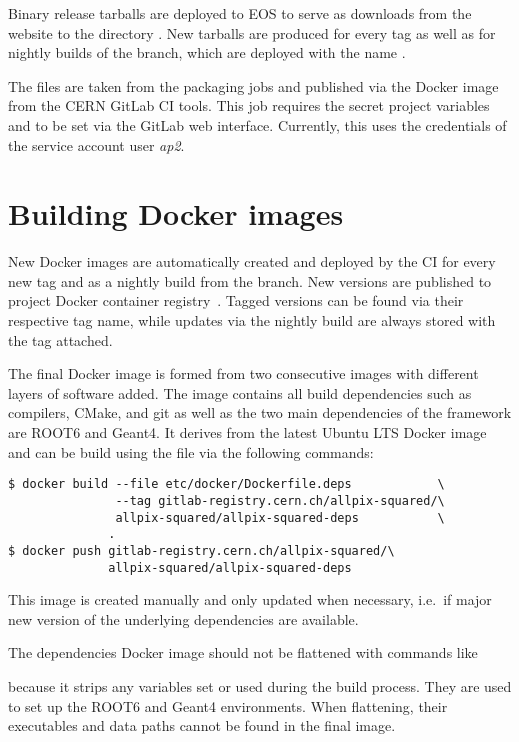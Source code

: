 Binary release tarballs are deployed to EOS to serve as downloads from the website to the directory .
New tarballs are produced for every tag as well as for nightly builds of the  branch, which are deployed with the name .

The files are taken from the packaging jobs and published via the  Docker image from the CERN GitLab CI tools.
This job requires the secret project variables  and  to be set via the GitLab web interface.
Currently, this uses the credentials of the service account user \emph{ap2}.

\section{Building Docker images}
\label{sec:build-docker}

New \apsq Docker images are automatically created and deployed by the CI for every new tag and as a nightly build from the  branch.
New versions are published to project Docker container registry~\cite{ap2-container-registry}.
Tagged versions can be found via their respective tag name, while updates via the nightly build are always stored with the  tag attached.

The final Docker image is formed from two consecutive images with different layers of software added.
The  image contains all build dependencies such as compilers, CMake, and git as well as the two main dependencies of the framework are ROOT6 and Geant4.
It derives from the latest Ubuntu LTS Docker image and can be build using the  file via the following commands:

\begin{verbatim}
$ docker build --file etc/docker/Dockerfile.deps            \
               --tag gitlab-registry.cern.ch/allpix-squared/\
               allpix-squared/allpix-squared-deps           \
              .
$ docker push gitlab-registry.cern.ch/allpix-squared/\
              allpix-squared/allpix-squared-deps
\end{verbatim}
This image is created manually and only updated when necessary, i.e.\ if major new version of the underlying dependencies are available.

\begin{warning}
  The dependencies Docker image should not be flattened with commands like


  because it strips any \parameter{ENV} variables set or used during the build process. They are used to set up the ROOT6 and Geant4 environments. When flattening, their executables and data paths cannot be found in the final \apsq image.
\end{warning}

